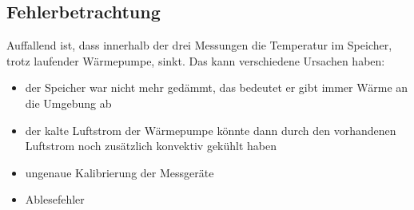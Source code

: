 \subsection{Fehlerbetrachtung}
Auffallend ist, dass innerhalb der drei Messungen die Temperatur im Speicher,
trotz laufender Wärmepumpe, sinkt. Das kann verschiedene Ursachen haben:
\begin{itemize}
    \item der Speicher war nicht mehr gedämmt, das bedeutet er gibt immer Wärme an die Umgebung ab
    \item der kalte Luftstrom der Wärmepumpe könnte dann durch den vorhandenen Luftstrom noch zusätzlich konvektiv gekühlt haben 
\item ungenaue Kalibrierung der Messgeräte
\item Ablesefehler
\end{itemize}


